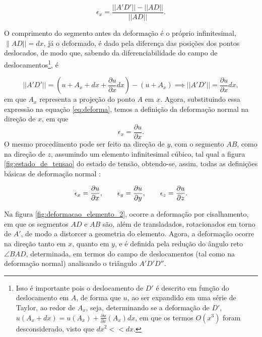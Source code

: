 \begin{equation}
    \epsilon_x = \frac{||A'D'|| - ||AD||}{||AD||}.
    \label{eq:deforma}
\end{equation}



O comprimento do segmento antes da deformação é o próprio infinitesimal, $\|AD|| = dx$, já o deformado, é dado pela diferença das posições dos pontos deslocados, de modo que, sabendo da diferenciabilidade do campo de deslocamentos\footnote{Isso é importante pois o deslocamento de $D'$ é descrito em função do deslocamento em $A$, de forma que $u$, ao ser expandido em uma série de Taylor, ao redor de $A_x$, seja, determinando se a deformação de $D'$, $u(A_x + dx) = u(A_x) + \frac{\partial u}{\partial x}(A_x) dx$, em que os termos $O(x^3)$ foram desconsiderado, visto que $dx^2 << dx$.}, é

\begin{equation}
    ||A'D'|| = (u + A_x + dx + \frac{\partial u}{\partial x} dx) - (u + A_x) \implies ||A'D'|| = \frac{\partial u}{\partial x} dx,
\end{equation}
em que $A_x$ representa a projeção do ponto $A$ em $x$.
Agora, substituindo essa expressão na equação \ref{eq:deforma}, temos a definição da deformação normal na direção de $x$, em que
\begin{equation}
    \epsilon_x = \frac{\partial u}{\partial x}.
\end{equation}
O mesmo procedimento pode ser feito na direção de $y$, com o segmento $AB$, como na direção de $z$, assumindo um elemento infinitesimal cúbico, tal qual a figura \ref{fig:estado_de_tensao} do estado de tensão, obtendo-se, assim, todas as definições básicas de deformação normal \cite{popov}:

\begin{equation}
    \epsilon_x = \frac{\partial u}{\partial x}, \qquad \epsilon_y = \frac{\partial u}{\partial y}, \qquad \epsilon_z = \frac{\partial u}{\partial z}. \\
\end{equation}  

Na figura \ref{fig:deformacao_elemento_2}, ocorre a deformação por cisalhamento, em que os segmentos $AD$ e $AB$ são, além de transladados, rotacionados em torno de $A'$, de modo a distorcer a geometria do elemento. Agora, a deformação ocorre na direção tanto em $x$, quanto em $y$, e é definida pela redução do ângulo reto $\angle BAD$, determinada, em termos do campo de deslocamentos (tal como na deformação normal) analisando o triângulo $A'D'D''$.

